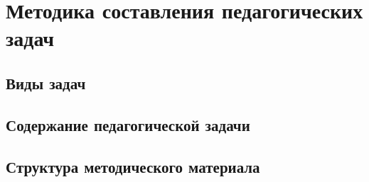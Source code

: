 \chapter{Методика составления педагогических задач}



\section{Виды задач}



\section{Содержание педагогической задачи}

\section{Структура методического материала}



